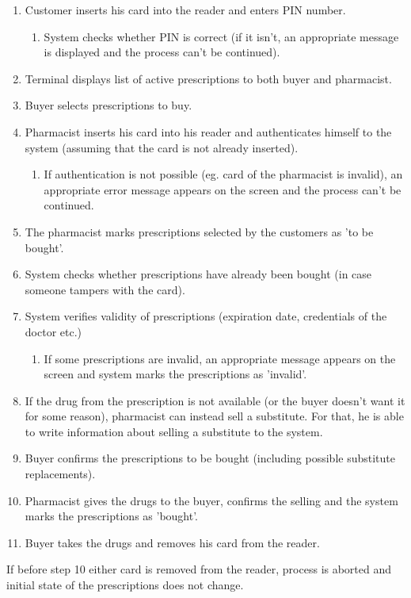 \begin{enumerate}
  \item Customer inserts his card into the reader and enters PIN number.
  \begin{enumerate}
	\item System checks whether PIN is correct (if it isn’t, an appropriate message is displayed and the process can’t be continued).
  \end{enumerate}
  \item Terminal displays list of active prescriptions to both buyer and pharmacist.
  \item Buyer selects prescriptions to buy.
  \item Pharmacist inserts his card into his reader and authenticates himself to the system (assuming that the card is not already inserted).
  \begin{enumerate}
	\item  If authentication is not possible (eg. card of the pharmacist is invalid), an appropriate error message appears on the screen and the process can't be continued.
  \end{enumerate}
  \item The pharmacist marks prescriptions selected by the customers as 'to be bought'.
  \item System checks whether prescriptions have already been bought (in case someone tampers with the card).
  \item System verifies validity of prescriptions (expiration date, credentials of the doctor etc.)
 \begin{enumerate}
	\item If some prescriptions are invalid, an appropriate message appears on the screen and system marks the prescriptions as 'invalid'.
  \end{enumerate}
  \item  If the drug from the prescription is not available (or the buyer doesn’t want it for some reason), pharmacist can instead sell a substitute. For that, he is able to write information about selling a substitute to the system.
  \item Buyer confirms the prescriptions to be bought (including possible substitute replacements).
  \item Pharmacist gives the drugs to the buyer, confirms the selling and the system marks the prescriptions as 'bought'.
  \item  Buyer takes the drugs and removes his card from the reader.
\end{enumerate}

 If before step 10 either card is removed from the reader, process is aborted and initial state of the prescriptions does not change.

